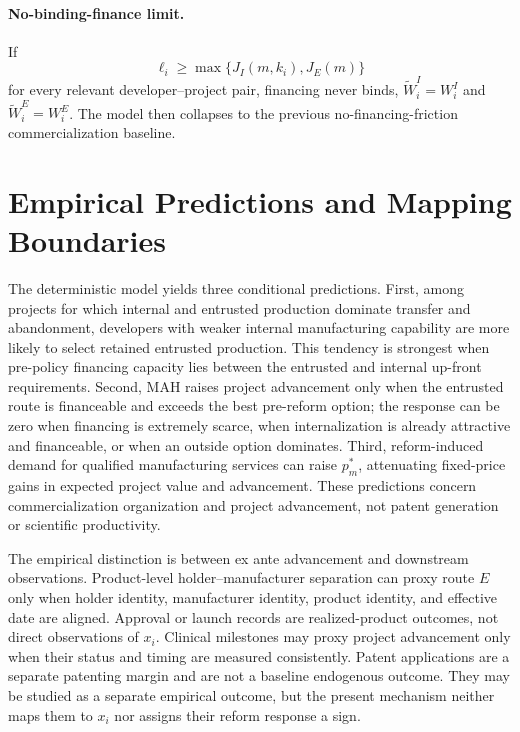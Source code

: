 \documentclass[12pt]{article}
\newcommand{\1}{\mathbf{1}}
\begin{document}
\paragraph{No-binding-finance limit.}
If
\[
  \ell_i\geq\max\{J_I(m,k_i),J_E(m)\}
\]
for every relevant developer--project pair, financing never binds,
\(\widetilde W_i^I=W_i^I\) and \(\widetilde W_i^E=W_i^E\). The model then
collapses to the previous no-financing-friction commercialization baseline.

\section{Empirical Predictions and Mapping Boundaries}

The deterministic model yields three conditional predictions. First, among
projects for which internal and entrusted production dominate transfer and
abandonment, developers with weaker internal manufacturing capability are
more likely to select retained entrusted production. This tendency is
strongest when pre-policy financing capacity lies between the entrusted and
internal up-front requirements. Second, MAH raises project advancement only
when the entrusted route is financeable and exceeds the best pre-reform
option; the response can be zero when financing is extremely scarce, when
internalization is already attractive and financeable, or when an outside
option dominates. Third, reform-induced demand for qualified manufacturing
services can raise \(p_m^*\), attenuating fixed-price gains in expected
project value and advancement. These predictions concern commercialization
organization and project advancement, not patent generation or scientific
productivity.

The empirical distinction is between ex ante advancement and downstream
observations. Product-level holder--manufacturer separation can proxy route
\(E\) only when holder identity, manufacturer identity, product identity, and
effective date are aligned. Approval or launch records are realized-product
outcomes, not direct observations of \(x_i\). Clinical milestones may proxy
project advancement only when their status and timing are measured consistently.
Patent applications are a separate patenting margin and are not a baseline
endogenous outcome. They may be studied as a separate empirical outcome, but
the present mechanism neither maps them to \(x_i\) nor assigns their reform
response a sign.
\end{document}
